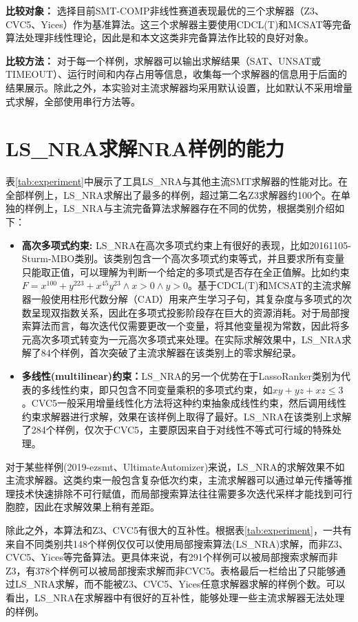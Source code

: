  \textbf{比较对象：} 选择目前SMT-COMP非线性赛道表现最优的三个求解器（Z3\cite{MouraB08}、CVC5\cite{BarbosaBBKLMMMN22}、Yices\cite{Dutertre14}）作为基准算法。这三个求解器主要使用CDCL(T)和MCSAT等完备算法处理非线性理论，因此是和本文这类非完备算法作比较的良好对象。

\textbf{比较方法：} 对于每一个样例，求解器可以输出求解结果（SAT、UNSAT或TIMEOUT）、运行时间和内存占用等信息，收集每一个求解器的信息用于后面的结果展示。除此之外，本实验对主流求解器均采用默认设置，比如默认不采用增量式求解，全部使用串行方法等。

\section{LS\_NRA求解NRA样例的能力}
表\ref{tab:experiment}中展示了工具LS\_NRA与其他主流SMT求解器的性能对比。在全部样例上，LS\_NRA求解出了最多的样例，超过第二名Z3求解器约100个。在单独的样例上，LS\_NRA与主流完备算法求解器存在不同的优势，根据类别介绍如下：
\begin{itemize}
    \item \textbf{高次多项式约束:} 
    LS\_NRA在高次多项式约束上有很好的表现，比如20161105-Sturm-MBO类别。该类别包含一个高次多项式约束等式，并且要求所有变量只能取正值，可以理解为判断一个给定的多项式是否存在全正值解。比如约束$F = x^{100} + y^{223} + x^{45} y^{23} \wedge x > 0 \wedge y > 0$。基于CDCL(T)和MCSAT的主流求解器一般使用柱形代数分解（CAD）用来产生学习子句，其复杂度与多项式的次数呈现双指数关系，因此在多项式投影阶段存在巨大的资源消耗。对于局部搜索算法而言，每次迭代仅需要更改一个变量，将其他变量视为常数，因此将多元高次多项式转变为一元高次多项式来处理。在实际求解效果中，LS\_NRA求解了84个样例，首次突破了主流求解器在该类别上的零求解纪录。

    \item \textbf{多线性(multilinear)约束：}LS\_NRA的另一个优势在于LassoRanker类别为代表的多线性约束，即只包含不同变量乘积的多项式约束，如$x y + y z + x z \leq 3$。CVC5一般采用增量线性化方法将这种约束抽象成线性约束，然后调用线性约束求解器进行求解，效果在该样例上取得了最好。LS\_NRA在该类别上求解了284个样例，仅次于CVC5，主要原因来自于对线性不等式可行域的特殊处理。
\end{itemize}

对于某些样例(2019-ezsmt、UltimateAutomizer)来说，LS\_NRA的求解效果不如主流求解器。这类约束一般包含复杂低次约束，主流求解器可以通过单元传播等推理技术快速排除不可行赋值，而局部搜索算法往往需要多次迭代采样才能找到可行胞腔，因此在求解效果上稍有差距。

除此之外，本算法和Z3、CVC5有很大的互补性。根据表\ref{tab:experiment}，一共有来自不同类别共148个样例仅仅可以使用局部搜索算法(LS\_NRA)求解，而非Z3、CVC5、Yices等完备算法。更具体来说，有291个样例可以被局部搜索求解而非Z3，有378个样例可以被局部搜索求解而非CVC5。表格最后一栏给出了只能够通过LS\_NRA求解，而不能被Z3、CVC5、Yices任意求解器求解的样例个数。可以看出，LS\_NRA在求解器中有很好的互补性，能够处理一些主流求解器无法处理的样例。

